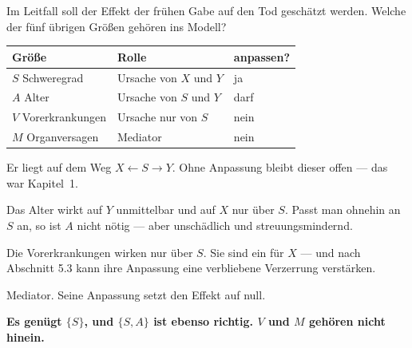\begin{aufgabe}
Im Leitfall soll der Effekt der frühen Gabe auf den Tod geschätzt werden. Welche der fünf übrigen Größen gehören ins Modell?

\loesung
{}
\begin{center}
{\small
\renewcommand{\arraystretch}{1.5}
\begin{tabular}{@{}P{2.4cm}P{3.0cm}P{2.6cm}@{}}
\toprule
\textbf{Größe} & \textbf{Rolle} & \textbf{anpassen?}\\
\midrule
$S$ Schweregrad & Ursache von $X$ und $Y$ & \textcolor{gruen}{ja}\\
$A$ Alter & Ursache von $S$ und $Y$ & \textcolor{gruen}{darf}\\
$V$ Vorerkrankungen & Ursache nur von $S$ & \textcolor{akzent}{nein}\\
$M$ Organversagen & Mediator & \textcolor{akzent}{nein}\\
\bottomrule
\end{tabular}}
\end{center}

 Er liegt auf dem Weg $X \leftarrow S \to Y$. Ohne Anpassung bleibt dieser offen --- das war Kapitel~1.

 Das Alter wirkt auf $Y$ unmittelbar und auf $X$ nur über $S$. Passt man ohnehin an $S$ an, so ist $A$ nicht nötig --- aber unschädlich und streuungsmindernd.

 Die Vorerkrankungen wirken nur über $S$. Sie sind ein  für $X$ --- und nach Abschnitt 5.3 kann ihre Anpassung eine verbliebene Verzerrung verstärken.

 Mediator. Seine Anpassung setzt den Effekt auf null.

\begin{center}
\begin{minipage}{0.9\textwidth}
\textbf{Es genügt $\{S\}$, und $\{S, A\}$ ist ebenso richtig. $V$ und $M$ gehören nicht hinein.}
\end{minipage}
\end{center}

\begin{center}
\begin{minipage}{0.88\textwidth}
\end{minipage}
\end{center}
\end{aufgabe}

